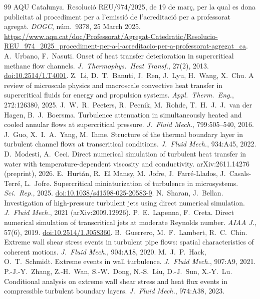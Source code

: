 \documentclass[11pt]{article}
\begin{document}
\begin{thebibliography}{99}
 AQU Catalunya. Resoluci\'o REU/974/2025, de 19 de mar\c{c}, per la qual es dona publicitat al procediment per a l'emissi\'o de l'acreditaci\'o per a professorat agregat. \emph{DOGC}, n\'um.~9378, 25 March 2025. \url{https://www.aqu.cat/doc/Professorat/Agregat-Catedratic/Resolucio-REU_974_2025_procediment-per-a-l-acreditacio-per-a-professorat-agregat_ca}.
 A.\ Urbano, F.\ Nasuti. Onset of heat transfer deterioration in supercritical methane flow channels. \emph{J.\ Thermophys.\ Heat Transf.}, 27(2), 2013. \href{https://doi.org/10.2514/1.T4001}{doi:10.2514/1.T4001}.
 Z.\ Li, D.\ T.\ Banuti, J.\ Ren, J.\ Lyu, H.\ Wang, X.\ Chu. A review of microscale physics and macroscale convective heat transfer in supercritical fluids for energy and propulsion systems. \emph{Appl.\ Therm.\ Eng.}, 272:126380, 2025.
 J.\ W.\ R.\ Peeters, R.\ Pecnik, M.\ Rohde, T.\ H.\ J.\ J.\ van der Hagen, B.\ J.\ Boersma. Turbulence attenuation in simultaneously heated and cooled annular flows at supercritical pressure. \emph{J.\ Fluid Mech.}, 799:505--540, 2016.
 J.\ Guo, X.\ I.\ A.\ Yang, M.\ Ihme. Structure of the thermal boundary layer in turbulent channel flows at transcritical conditions. \emph{J.\ Fluid Mech.}, 934:A45, 2022.
 D.\ Modesti, A.\ Ceci. Direct numerical simulation of turbulent heat transfer in water with temperature-dependent viscosity and conductivity. arXiv:2611.14276 (preprint), 2026.
 E.\ Hurt\'an, R.\ El Mansy, M.\ Jofre, J.\ Farr\'e-Llados, J.\ Casals-Terr\'e, L.\ Jofre. Supercritical miniaturization of turbulence in microsystems. \emph{Sci.\ Rep.}, 2025. \href{https://doi.org/10.1038/s41598-025-20583-9}{doi:10.1038/s41598-025-20583-9}.
 N.\ Sharan, J.\ Bellan. Investigation of high-pressure turbulent jets using direct numerical simulation. \emph{J.\ Fluid Mech.}, 2021 (arXiv:2009.12926).
 P.\ E.\ Lapenna, F.\ Creta. Direct numerical simulation of transcritical jets at moderate Reynolds number. \emph{AIAA J.}, 57(6), 2019. \href{https://doi.org/10.2514/1.J058360}{doi:10.2514/1.J058360}.
 B.\ Guerrero, M.\ F.\ Lambert, R.\ C.\ Chin. Extreme wall shear stress events in turbulent pipe flows: spatial characteristics of coherent motions. \emph{J.\ Fluid Mech.}, 904:A18, 2020.
 M.\ J.\ P.\ Hack, O.\ T.\ Schmidt. Extreme events in wall turbulence. \emph{J.\ Fluid Mech.}, 907:A9, 2021.
 P.-J.-Y.\ Zhang, Z.-H.\ Wan, S.-W.\ Dong, N.-S.\ Liu, D.-J.\ Sun, X.-Y.\ Lu. Conditional analysis on extreme wall shear stress and heat flux events in compressible turbulent boundary layers. \emph{J.\ Fluid Mech.}, 974:A38, 2023.

\end{thebibliography}
\end{document}
